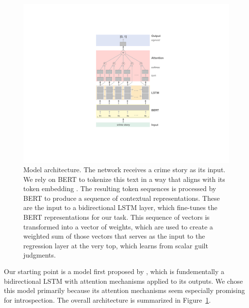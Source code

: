 \documentclass[11pt,a4paper]{article}
\begin{document}
\begin{figure}
  \includegraphics[width=\linewidth]{graphs/model.pdf}
  \caption{Model architecture. The network receives a crime
    story as its input. We rely on BERT to tokenize this
    text in a way that aligns with its token embedding \citep{wu2016google}.
    The resulting token sequences is processed by BERT
    to produce a sequence of contextual representations.
    These are the input to a bidirectional LSTM layer,
    which fine-tunes the BERT representations for our
    task. This sequence of vectors is transformed into a
    vector of weights, which are used to create a weighted
    sum of those vectors that serves as the input to the
    regression layer at the very top, which learns from
    scalar guilt judgments.}
  \label{fig:model}
\end{figure}

Our starting point is a model first proposed by \citeauthor{Lin:2017}, which is fundementally a  bidirectional LSTM with attention mechanisms applied to its outputs. We chose this model primarily because its attention mechanisms seem especially promising for introspection.  The overall architecture is summarized in Figure~\ref{fig:model}.

\end{document}
